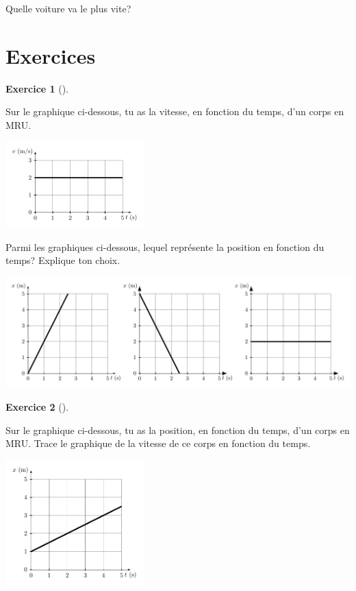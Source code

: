 \documentclass[
  letterpaper,
  DIV=11,
  numbers=noendperiod]{scrartcl}
\theoremstyle{definition}
\theoremstyle{definition}
\newtheorem{exercise}{Exercice}[section]
\theoremstyle{remark}
\begin{document}
Quelle voiture va le plus vite?

\vspace{3cm}
\newpage

\section{Exercices}\label{exercices}

\begin{exercise}[]\protect\hypertarget{exr-xapdv}{}\label{exr-xapdv}

Sur le graphique ci-dessous, tu as la vitesse, en fonction du temps,
d'un corps en MRU.

\begin{center}
\includegraphics[width=0.4\textwidth,height=\textheight]{figures/mru/fig6.pdf}
\end{center}

Parmi les graphiques ci-dessous, lequel représente la position en
fonction du temps? Explique ton choix. \begin{center}
\includegraphics[width=1\textwidth,height=\textheight]{figures/mru/fig7.pdf}
\end{center}

\end{exercise}

\newpage

\begin{exercise}[]\protect\hypertarget{exr-vapdx}{}\label{exr-vapdx}

Sur le graphique ci-dessous, tu as la position, en fonction du temps,
d'un corps en MRU. Trace le graphique de la vitesse de ce corps en
fonction du temps.

\begin{center}
\includegraphics[width=0.4\textwidth,height=\textheight]{figures/mru/fig8.pdf}
\end{center}

\end{exercise}
\end{document}
